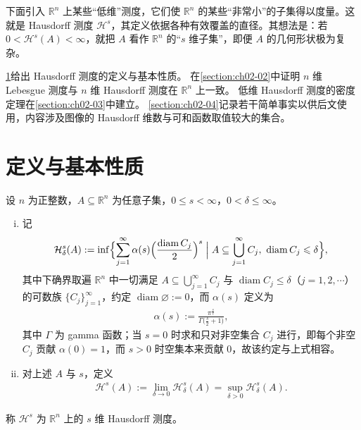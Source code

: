 \documentclass[../../main.tex]{subfiles}%
\begin{document}
下面引入 $\mathbb{R}^n$ 上某些“低维”测度，它们使 $\mathbb{R}^n$ 的某些“非常小”的子集得以度量。这就是 Hausdorff 测度 $\mathcal{H}^s$，其定义依据各种有效覆盖的直径。其想法是：若 $0<\mathcal{H}^s(A)<\infty$，就把 $A$ 看作 $\mathbb{R}^n$ 的“$s$ 维子集”，即便 $A$ 的几何形状极为复杂。

\cref{section:ch02-01}给出 Hausdorff 测度的定义与基本性质。%
在\cref{section:ch02-02}中证明 $n$ 维 Lebesgue 测度与 $n$ 维 Hausdorff 测度在 $\mathbb{R}^n$ 上一致。%
低维 Hausdorff 测度的密度定理在\cref{section:ch02-03}中建立。%
\cref{section:ch02-04}记录若干简单事实以供后文使用，内容涉及图像的 Hausdorff 维数与可和函数取值较大的集合。%

\section{定义与基本性质}\label{section:ch02-01}

\begin{definition}[Hausdorff 测度]\label{definition:ch02-2-1}
设 $n$ 为正整数，$A\subseteq\mathbb{R}^n$ 为任意子集，$0\leqslant s<\infty$，$0<\delta\leqslant\infty$。
\begin{enumerate}[(i)]
\item 记
\begin{align*}
\mathcal{H}^s_\delta(A):=\inf\Bigl\{\sum_{j=1}^{\infty}\alpha(s)\Bigl(\frac{\operatorname{diam}C_j}{2}\Bigr)^s\Bigm| A\subseteq\bigcup_{j=1}^{\infty}C_j,\ \operatorname{diam}C_j\leqslant\delta\Bigr\},
\end{align*}
其中下确界取遍 $\mathbb{R}^n$ 中一切满足 $A\subseteq\bigcup_{j=1}^{\infty}C_j$ 与 $\operatorname{diam}C_j\leqslant\delta$（$j=1,2,\cdots$）的可数族 $\{C_j\}_{j=1}^{\infty}$，约定 $\operatorname{diam}\varnothing:=0$，而 $\alpha(s)$ 定义为
\begin{align*}
\alpha(s):=\frac{\pi^{\frac{s}{2}}}{\Gamma\bigl(\frac{s}{2}+1\bigr)},
\end{align*}
其中 $\Gamma$ 为 gamma 函数；当 $s=0$ 时求和只对非空集合 $C_j$ 进行，即每个非空 $C_j$ 贡献 $\alpha(0)=1$，而 $s>0$ 时空集本来贡献 $0$，故该约定与上式相容。
\item 对上述 $A$ 与 $s$，定义
\begin{align*}
\mathcal{H}^s(A):=\lim_{\delta\to0}\mathcal{H}^s_\delta(A)=\sup_{\delta>0}\mathcal{H}^s_\delta(A).
\end{align*}
\end{enumerate}
称 $\mathcal{H}^s$ 为 $\mathbb{R}^n$ 上的 $s$ 维 Hausdorff 测度。
\end{definition}
\end{document}
